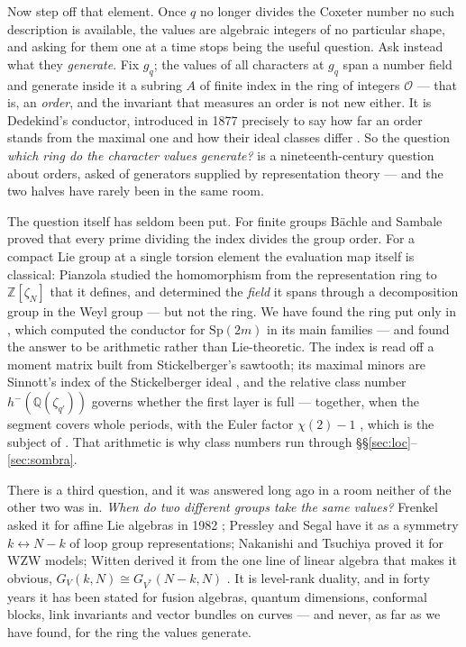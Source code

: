 \documentclass[11pt,a4paper]{article}
\theoremstyle{definition}
\newcommand{\Sp}{\mathrm{Sp}}
\newcommand{\ZZ}{\mathbb{Z}}
\newcommand{\QQ}{\mathbb{Q}}
\newcommand{\cO}{\mathcal{O}}
\begin{document}
Now step off that element. Once $q$ no longer divides the Coxeter number no such description is
available, the values are algebraic integers of no particular shape, and asking for them one at a
time stops being the useful question. Ask instead what they \emph{generate}. Fix $g_q$; the values
of all characters at $g_q$ span a number field and generate inside it a subring $A$ of finite index
in the ring of integers $\cO$ --- that is, an \emph{order}, and the invariant that measures an order
is not new either. It is Dedekind's conductor, introduced in 1877 precisely to say how far an order
stands from the maximal one and how their ideal classes differ \cite{Ded77}. So the question
\emph{which ring do the character values generate?} is a nineteenth-century question about orders,
asked of generators supplied by representation theory --- and the two halves have rarely been in the
same room.

The question itself has seldom been put. For finite groups B\"achle and Sambale \cite{BS} proved
that every prime dividing the index divides the group order. For a compact Lie group at a single
torsion element the evaluation map itself is classical: Pianzola studied the homomorphism from the
representation ring to $\ZZ[\zeta_N]$ that it defines, and determined the \emph{field} it spans
through a decomposition group in the Weyl group \cite[Prop.~10, Prop.~13(b)]{Pia87} --- but not the
ring. We have found the ring put only in \cite{Cond}, which computed the conductor for $\Sp(2m)$ in its main
families --- and found the answer to be arithmetic rather than Lie-theoretic. The index is read off a moment matrix built from
Stickelberger's sawtooth; its maximal minors are Sinnott's index of the Stickelberger ideal
\cite{Sin78}, and the relative class number $h^-(\QQ(\zeta_{q'}))$ governs whether the first layer is
full --- together, when the segment covers whole periods, with the Euler factor $\chi(2)-1$
\cite[Cor.~17]{Cond}, which is the subject of \cite{II}. That arithmetic is why class numbers run through \S\S\ref{sec:loc}--\ref{sec:sombra}.

There is a third question, and it was answered long ago in a room neither of the other two was in.
\emph{When do two different groups take the same values?} Frenkel asked it for affine Lie algebras
in 1982 \cite{Fre82}; Pressley and Segal have it as a symmetry $k\leftrightarrow N-k$ of loop group
representations; Nakanishi and Tsuchiya proved it for WZW models; Witten derived it from the one
line of linear algebra that makes it obvious, $G_V(k,N)\cong G_{V^*}(N-k,N)$
\cite{PS86,NT92,Wit93}. It is level-rank duality, and in forty years it has been stated for fusion
algebras, quantum dimensions, conformal blocks, link invariants and vector bundles on curves ---
and never, as far as we have found, for the ring the values generate.
\end{document}
